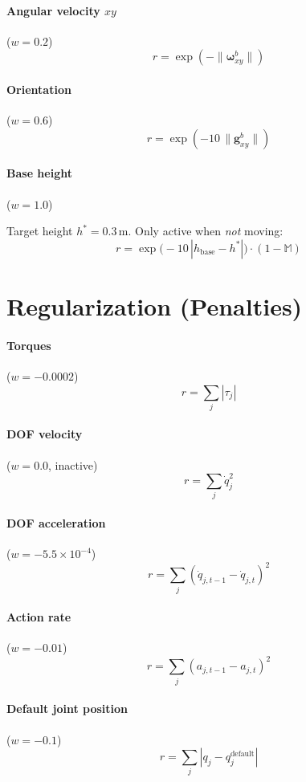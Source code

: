 \documentclass[11pt, a4paper]{article}
\begin{document}
\paragraph{Angular velocity $xy$} ($w = 0.2$)
\[
  r = \exp(-\|\bm{\omega}^b_{xy}\|)
\]

\paragraph{Orientation} ($w = 0.6$)
\[
  r = \exp(-10\,\|\bm{g}^b_{xy}\|)
\]

\paragraph{Base height} ($w = 1.0$)

Target height $h^* = 0.3\,\text{m}$. Only active when \emph{not} moving:
\[
  r = \exp\!\bigl(-10\,|h_{\text{base}} - h^*|\bigr) \cdot (1 - \mathbb{M})
\]

\section{Regularization (Penalties)}

\paragraph{Torques} ($w = -0.0002$)
\[
  r = \sum_{j} |\tau_j|
\]

\paragraph{DOF velocity} ($w = 0.0$, inactive)
\[
  r = \sum_{j} \dot{q}_j^2
\]

\paragraph{DOF acceleration} ($w = -5.5 \times 10^{-4}$)
\[
  r = \sum_{j} (\dot{q}_{j,t-1} - \dot{q}_{j,t})^2
\]

\paragraph{Action rate} ($w = -0.01$)
\[
  r = \sum_{j} (a_{j,t-1} - a_{j,t})^2
\]

\paragraph{Default joint position} ($w = -0.1$)
\[
  r = \sum_{j} |q_j - q_j^{\text{default}}|
\]
\end{document}
